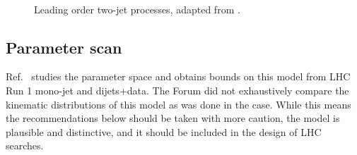 \begin{figure}
\begin{feynmandiagram}[modelTDijetD]
  \end{feynmandiagram}\\\vspace{3\baselineskip}
  \begin{feynmandiagram}[modelTDijetE]
  \end{feynmandiagram}\quad
  \begin{feynmandiagram}[modelTDijetGGG]
  \end{feynmandiagram}
\caption{Leading order two-jet \tchannel processes, adapted from \cite{Papucci:2014iwa}.}\label{fig:tchannelDijet}
\end{figure}

\subsection{Parameter scan}

Ref.~\cite{Papucci:2014iwa} studies the parameter space and obtains
bounds on this model from LHC Run 1 mono-jet and dijets+\MET data. The Forum did not exhaustively compare the kinematic distributions of this model as was done in the \schannel case. While this means the recommendations below should be taken with more caution, the model is plausible and distinctive, and it should be included in the design of LHC searches.


